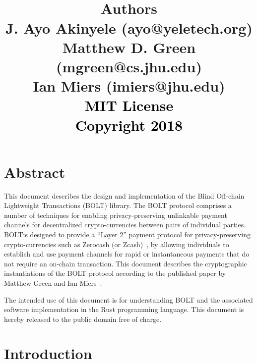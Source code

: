 \documentclass[10pt]{report}
\title{%
\vspace{-1in}
\center
\vspace{1in}
\center
\textcolor{black}{
  {\selectfont{\huge{Blind Off-Chain\\Lightweight Transactions\\(BOLT)}}}}
  \center
  \textcolor{black}{
  {\selectfont{\huge{Version \myversion}}}}
\vspace{1in}
\\
{{\bf Authors}\\J. Ayo Akinyele (ayo@yeletech.org) \\ Matthew D. Green (mgreen@cs.jhu.edu) \\ Ian Miers (imiers@jhu.edu)}
\\
\vspace{2in}
  \textcolor{black}{
  {{\small{MIT License\\Copyright {\textcopyright} 2018}}}}
}
\date{}
\begin{document}
\maketitle
\tableofcontents
\thispagestyle{myfancypage}

\newpage
\chapter*{Abstract}
\label{ch:abstract}
\thispagestyle{myfancypage}

This document describes the design and implementation of the Blind Off-chain Lightweight Transactions (BOLT) library. The BOLT protocol comprises a number of techniques for enabling privacy-preserving unlinkable payment channels for decentralized crypto-currencies between pairs of individual parties. BOLTis designed to provide a ``Layer 2'' payment protocol for privacy-preserving crypto-currencies such as Zerocash (or Zcash)~\cite{TODO}, by allowing individuals to establish and use payment channels for rapid or instantaneous payments that do not require an on-chain transaction. This document describes the cryptographic instantiations of the BOLT protocol according to the published paper by Matthew Green and Ian Miers~\cite{TODO}.



The intended use of this document is for understanding BOLT and the associated software implementation in the Rust programming language.  
This document is hereby released to the public domain free of charge.

\thispagestyle{myfancypage}
\chapter{Introduction}
\label{sec:introduction}
\thispagestyle{myfancypage}
\end{document}
